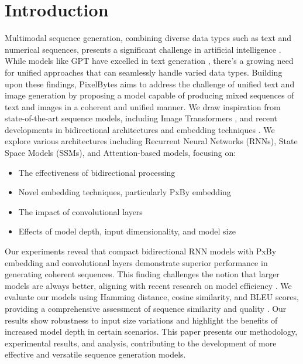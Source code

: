\documentclass[10pt,a4paper]{article}
\begin{document}
\section{Introduction}

Multimodal sequence generation, combining diverse data types such as text and numerical sequences, presents a significant challenge in artificial intelligence \cite{baltrusaitis2019multimodal}. While models like GPT have excelled in text generation \cite{brown2020language}, there's a growing need for unified approaches that can seamlessly handle varied data types. Building upon these findings, PixelBytes aims to address the challenge of unified text and image generation by proposing a model capable of producing mixed sequences of text and images in a coherent and unified manner. We draw inspiration from state-of-the-art sequence models, including Image Transformers \cite{parmar2018image}, and recent developments in bidirectional architectures \cite{schuster1997bidirectional, bimamba} and embedding techniques \cite{mikolov2013efficient, mambabyte}. We explore various architectures including Recurrent Neural Networks (RNNs), State Space Models (SSMs), and Attention-based models, focusing on:

\begin{itemize}
    \item The effectiveness of bidirectional processing
    \item Novel embedding techniques, particularly PxBy embedding
    \item The impact of convolutional layers
    \item Effects of model depth, input dimensionality, and model size
\end{itemize}

Our experiments reveal that compact bidirectional RNN models with PxBy embedding and convolutional layers demonstrate superior performance in generating coherent sequences. This finding challenges the notion that larger models are always better, aligning with recent research on model efficiency \cite{tan2019efficientnet}. We evaluate our models using Hamming distance, cosine similarity, and BLEU scores, providing a comprehensive assessment of sequence similarity and quality \cite{papineni2002bleu}. Our results show robustness to input size variations and highlight the benefits of increased model depth in certain scenarios. This paper presents our methodology, experimental results, and analysis, contributing to the development of more effective and versatile sequence generation models.
\end{document}

